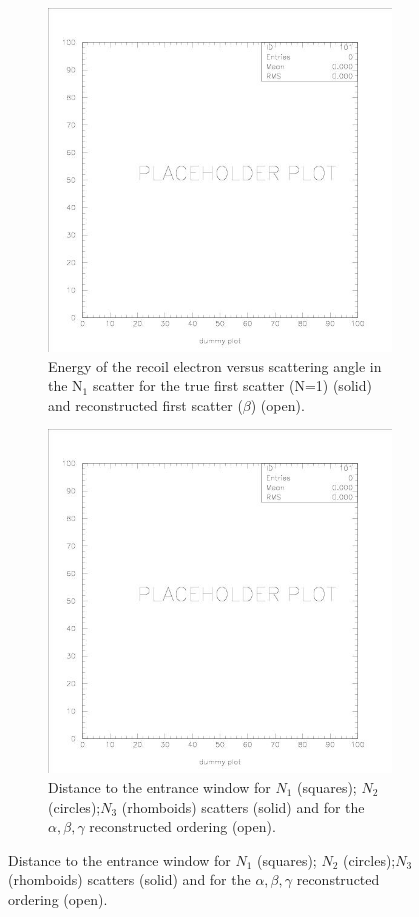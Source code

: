 \documentclass[12pt]{article}
\begin{document}
\begin{figure}[p]
\medskip
 \begin{subfigure}{0.495\textwidth}
        \centering
                \includegraphics[width=0.6\linewidth]{Figures/dummy.jpg}
                \caption{Energy of the recoil electron versus scattering angle in the
                N$_1$ scatter for the true first scatter (N=1) (solid) and reconstructed first scatter ($\beta$) (open). }
                \label{fig:cf_3rd_plot}
        \end{subfigure}
       \hfil
        \begin{subfigure}{0.495\textwidth}
            \centering
                \includegraphics[width=0.6\linewidth]{Figures/dummy.jpg}
                \caption{Distance to the entrance window for $N_1$ (squares);
                $N_2$ (circles);$N_3$ (rhomboids) scatters (solid) and for the $\alpha,\beta,\gamma$ reconstructed ordering (open).}
                \label{fig:cf_4th_plot}
        \end{subfigure}
\medskip



\end{figure}
\end{document}
